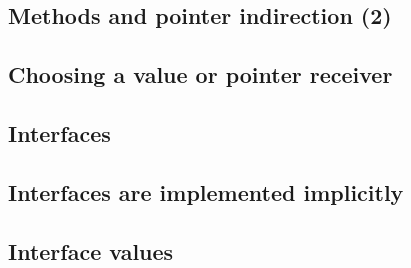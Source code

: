 \subsection{Methods and pointer indirection (2)}




\subsection{Choosing a value or pointer receiver}




\subsection{Interfaces}




\subsection{Interfaces are implemented implicitly}




\subsection{Interface values}
